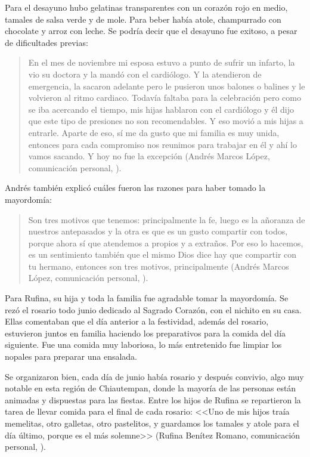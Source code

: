 \documentclass[14pt,letterpaper,twoside]{extbook} %
\begin{document}
Para el desayuno hubo gelatinas transparentes con un corazón rojo en medio, tamales de salsa verde y de mole. Para beber había atole, champurrado con chocolate y arroz con leche. Se podría decir que el desayuno fue exitoso, a pesar de dificultades previas:

\begin{quotation}
\noindent En el mes de noviembre mi esposa estuvo a punto de sufrir un infarto, la vio su doctora y la mandó con el cardiólogo. Y la atendieron de emergencia, la sacaron adelante pero le pusieron unos balones o balines y le volvieron al ritmo cardiaco. Todavía faltaba para la celebración pero como se iba acercando el tiempo, mis hijas hablaron con el cardiólogo y él dijo que este tipo de presiones no son recomendables. Y eso movió a mis hijas a entrarle. Aparte de eso, sí me da gusto que mi familia es muy unida, entonces para cada compromiso nos reunimos para trabajar en él y ahí lo vamos sacando. Y hoy no fue la excepción (Andrés Marcos López, comunicación personal, ).
\end{quotation}

\noindent Andrés también explicó cuáles fueron las razones para haber tomado la mayordomía:

\begin{quotation}
\noindent Son tres motivos que tenemos: principalmente la fe, luego es la añoranza de nuestros antepasados y la otra es que es un gusto compartir con todos, porque ahora sí que atendemos a propios y a extraños. Por eso lo hacemos, es un sentimiento también que el mismo Dios dice hay que compartir con tu hermano, entonces son tres motivos, principalmente (Andrés Marcos López, comunicación personal, ).
\end{quotation}

\noindent Para Rufina, su hija y toda la familia fue agradable tomar la mayordomía. Se rezó el rosario todo junio dedicado al Sagrado Corazón, con el nichito en su casa. Ellas comentaban que el día anterior a la festividad, además del rosario, estuvieron juntos en familia haciendo los preparativos para la comida del día siguiente. Fue una comida muy laboriosa, lo más entretenido fue limpiar los nopales para preparar una ensalada.

Se organizaron bien, cada día de junio había rosario y después convivio, algo muy notable en esta región de Chiautempan, donde la mayoría de las personas están animadas y dispuestas para las fiestas. Entre los hijos de Rufina se repartieron la tarea de llevar comida para el final de cada rosario: <<Uno de mis hijos traía memelitas, otro galletas, otro pastelitos, y guardamos los tamales y atole para el día último, porque es el más solemne>> (Rufina Benítez Romano, comunicación personal, ).
\end{document}
